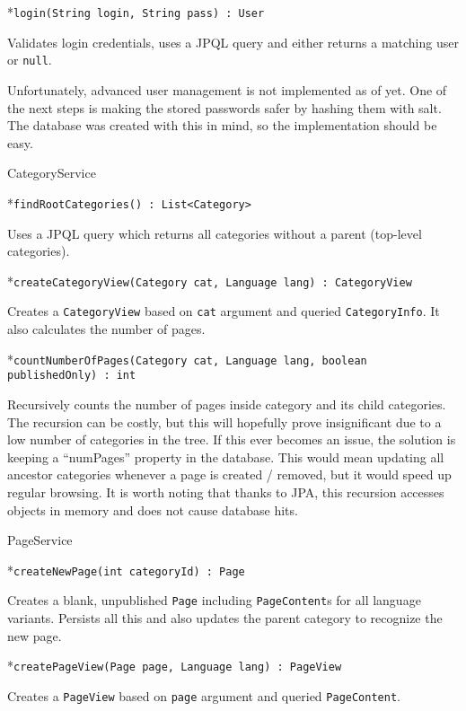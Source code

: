 *{\tt login(String login, String pass) : User}

Validates login credentials, uses a JPQL query and either returns a matching user or {\tt null}.

\enditems

Unfortunately, advanced user management is not implemented as of yet. One of the next steps is making the stored passwords safer by hashing them with salt. The database was created with this in mind, so the implementation should be easy.

\secc CategoryService

\begitems

*{\tt findRootCategories() : List<Category>}

Uses a JPQL query which returns all categories without a parent (top-level categories).

*{\tt createCategoryView(Category cat, Language lang) : CategoryView}

Creates a {\tt CategoryView} based on {\tt cat} argument and queried {\tt CategoryInfo}. It also calculates the number of pages.

*{\tt countNumberOfPages(Category cat, Language lang, boolean publishedOnly) : int}

Recursively counts the number of pages inside category and its child categories. The recursion can be costly, but this will hopefully prove insignificant due to a low number of categories in the tree. If this ever becomes an issue, the solution is keeping a “numPages” property in the database. This would mean updating all ancestor categories whenever a page is created / removed, but it would speed up regular browsing. It is worth noting that thanks to JPA, this recursion accesses objects in memory and does not cause database hits.

\enditems

\secc PageService

\begitems

*{\tt createNewPage(int categoryId) : Page}

Creates a blank, unpublished {\tt Page} including {\tt PageContent}s for all language variants. Persists all this and also updates the parent category to recognize the new page.

*{\tt createPageView(Page page, Language lang) : PageView}

Creates a {\tt PageView} based on {\tt page} argument and queried {\tt PageContent}.

\enditems

